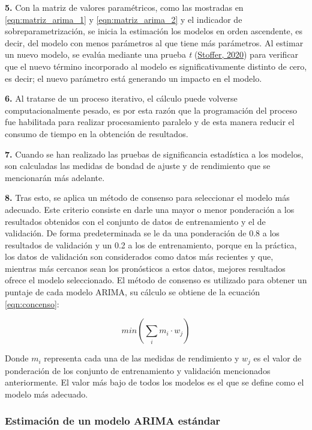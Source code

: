 \documentclass[
]{article}
\begin{document}
\textbf{5.} Con la matriz de valores paramétricos, como las mostradas en
\eqref{eqn:matriz_arima_1} y \eqref{eqn:matriz_arima_2} y el indicador
de sobreparametrización, se inicia la estimación los modelos en orden
ascendente, es decir, del modelo con menos parámetros al que tiene más
parámetros. Al estimar un nuevo modelo, se evalúa mediante una prueba
\emph{t} (\protect\hyperlink{ref-astsa}{Stoffer, 2020}) para verificar
que el nuevo término incorporado al modelo es significativamente
distinto de cero, es decir; el nuevo parámetro está generando un impacto
en el modelo.

\textbf{6.} Al tratarse de un proceso iterativo, el cálculo puede
volverse computacionalmente pesado, es por esta razón que la
programación del proceso fue habilitada para realizar procesamiento
paralelo y de esta manera reducir el consumo de tiempo en la obtención
de resultados.

\textbf{7.} Cuando se han realizado las pruebas de significancia
estadística a los modelos, son calculadas las medidas de bondad de
ajuste y de rendimiento que se mencionarán más adelante.

\textbf{8.} Tras esto, se aplica un método de consenso para seleccionar
el modelo más adecuado. Este criterio consiste en darle una mayor o
menor ponderación a los resultados obtenidos con el conjunto de datos de
entrenamiento y el de validación. De forma predeterminada se le da una
ponderación de 0.8 a los resultados de validación y un 0.2 a los de
entrenamiento, porque en la práctica, los datos de validación son
considerados como datos más recientes y que, mientras más cercanos sean
los pronósticos a estos datos, mejores resultados ofrece el modelo
seleccionado. El método de consenso es utilizado para obtener un puntaje
de cada modelo ARIMA, su cálculo se obtiene de la ecuación
\eqref{eqn:concenso}:

\begin{equation}
\label{eqn:concenso}
min\left( \sum_i {m_i}\cdot w_j \right)
\end{equation}

Donde \(m_i\) representa cada una de las medidas de rendimiento y
\(w_j\) es el valor de ponderación de los conjunto de entrenamiento y
validación mencionados anteriormente. El valor más bajo de todos los
modelos es el que se define como el modelo más adecuado.

\subsubsection{Estimación de un modelo ARIMA estándar}
\end{document}
